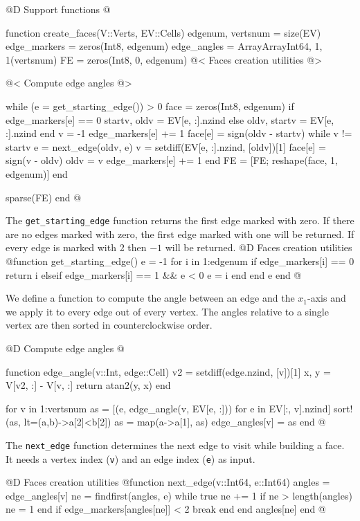 \documentclass[10pt,oneside]{article}
\begin{document}
@D Support functions
@{function create_faces(V::Verts, EV::Cells)
    edgenum, vertsnum = size(EV)
    edge_markers = zeros(Int8, edgenum)
    edge_angles = Array{Array{Int64, 1}, 1}(vertsnum)
    FE = zeros(Int8, 0, edgenum)
    @< Faces creation utilities @>

    @< Compute edge angles @>

    while (e = get_starting_edge()) > 0
        face = zeros(Int8, edgenum)
        if edge_markers[e] == 0
            startv, oldv = EV[e, :].nzind
        else
            oldv, startv = EV[e, :].nzind
        end
        v = -1
        edge_markers[e] += 1
        face[e] = sign(oldv - startv)
        while v != startv
            e = next_edge(oldv, e)
            v = setdiff(EV[e, :].nzind, [oldv])[1]
            face[e] = sign(v - oldv)
            oldv = v
            edge_markers[e] += 1
        end
        FE = [FE; reshape(face, 1, edgenum)]
    end

    sparse(FE)
end
@}
The \texttt{get\_starting\_edge} function returns the first edge
marked with zero. If there are no edges marked with zero, the first edge
marked with one will be returned. If every edge is marked with 2 then $-1$
will be returned.
@D Faces creation utilities
@{function get_starting_edge()
    e = -1
    for i in 1:edgenum
        if edge_markers[i] == 0
            return i
        elseif edge_markers[i] == 1 && e < 0
            e = i
        end
    end
    e
end
@}

We define a function to compute the angle between an edge and the 
$x_1$-axis and we apply it to every edge out of every vertex.
The angles relative to a single vertex are then sorted in counterclockwise order.

@D Compute edge angles
@{function edge_angle(v::Int, edge::Cell)
    v2 = setdiff(edge.nzind, [v])[1]
    x, y = V[v2, :] - V[v, :]
    return atan2(y, x)
end

for v in 1:vertsnum
    as = [(e, edge_angle(v, EV[e, :])) for e in EV[:, v].nzind]
    sort!(as, lt=(a,b)->a[2]<b[2])
    as = map(a->a[1], as)
    edge_angles[v] = as
end
@}

The \texttt{next\_edge} function determines the next edge to visit
while building a face. It needs a vertex index (\texttt{v}) and 
an edge index (\texttt{e}) as input.

@D Faces creation utilities
@{function next_edge(v::Int64, e::Int64)
    angles = edge_angles[v]
    ne = findfirst(angles, e)
    while true
        ne += 1
        if ne > length(angles)
            ne = 1
        end
        if edge_markers[angles[ne]] < 2
            break
        end
    end
    angles[ne]
end
@}
\end{document}
